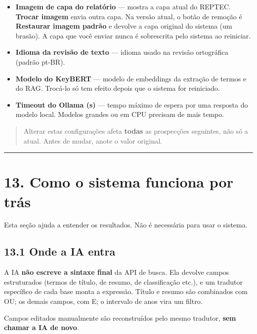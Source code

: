 \documentclass[
  brazilian,
  a4paper,12pt,oneside]{report}
\providecommand{\tightlist}{%
  \setlength{\itemsep}{0pt}\setlength{\parskip}{0pt}}
\begin{document}
\begin{itemize}
\tightlist
\item
  \textbf{Imagem de capa do relatório} --- mostra a capa atual do
  REPTEC. \textbf{Trocar imagem} envia outra capa. Na versão atual, o
  botão de remoção é \textbf{Restaurar imagem padrão} e devolve a capa
  original do sistema (um brasão). A capa que você enviar nunca é
  sobrescrita pelo sistema ao reiniciar.
\item
  \textbf{Idioma da revisão de texto} --- idioma usado na revisão
  ortográfica (padrão pt-BR).
\item
  \textbf{Modelo do KeyBERT} --- modelo de embeddings da extração de
  termos e do RAG. Trocá-lo só tem efeito depois que o sistema for
  reiniciado.
\item
  \textbf{Timeout do Ollama (s)} --- tempo máximo de espera por uma
  resposta do modelo local. Modelos grandes ou em CPU precisam de mais
  tempo.
\end{itemize}

\begin{quote}
Alterar estas configurações afeta \textbf{todas} as prospecções
seguintes, não só a atual. Antes de mudar, anote o valor original.
\end{quote}

\begin{center}\rule{0.5\linewidth}{0.5pt}\end{center}

\chapter{13. Como o sistema funciona por
trás}\label{como-o-sistema-funciona-por-truxe1s}

Esta seção ajuda a entender os resultados. Não é necessária para usar o
sistema.

\section{13.1 Onde a IA entra}\label{onde-a-ia-entra}

A IA \textbf{não escreve a sintaxe final} da API de busca. Ela devolve
campos estruturados (termos de título, de resumo, de classificação
etc.), e um tradutor específico de cada base monta a expressão. Título e
resumo são combinados com OU; os demais campos, com E; o intervalo de
anos vira um filtro.

Campos editados manualmente são reconstruídos pelo mesmo tradutor,
\textbf{sem chamar a IA de novo}.
\end{document}
